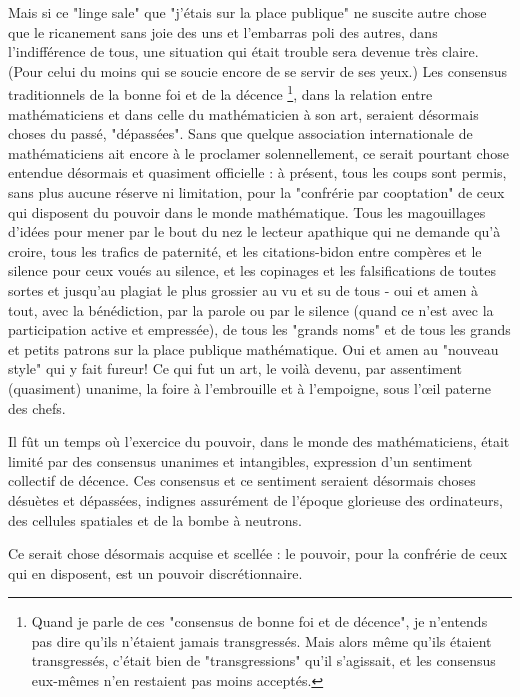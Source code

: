 Mais si ce "linge sale" que "j'étais sur la place publique" ne suscite autre chose que le ricanement sans joie des uns et l'embarras poli des autres, dans l'indifférence de tous, une situation qui était trouble sera devenue très claire. (Pour celui du moins qui se soucie encore de se servir de ses yeux.) Les consensus traditionnels de la bonne foi et de la décence \footnote{Quand je parle de ces "consensus de bonne foi et de décence", je n'entends pas dire qu'ils n'étaient jamais transgressés. Mais alors même qu'ils étaient transgressés, c'était bien de "transgressions" qu'il s'agissait, et les consensus eux-mêmes n'en restaient pas moins acceptés.}, dans la relation entre mathématiciens et dans celle du mathématicien à son art, seraient désormais choses du passé, "dépassées". Sans que quelque association internationale de mathématiciens ait encore à le proclamer solennellement, ce serait pourtant chose entendue désormais et quasiment officielle : à présent, tous les coups sont permis, sans plus aucune réserve ni limitation, pour la "confrérie par cooptation" de ceux qui disposent du pouvoir dans le monde mathématique. Tous les magouillages d'idées pour mener par le bout du nez le lecteur apathique qui ne demande qu'à croire, tous les trafics de paternité, et les citations-bidon entre compères et le silence pour ceux voués au silence, et les copinages et les falsifications de toutes sortes et jusqu'au plagiat le plus grossier au vu et su de tous - oui et amen à tout, avec la bénédiction, par la parole ou par le silence (quand ce n'est avec la participation active et empressée), de tous les "grands noms" et de tous les grands et petits patrons sur la place publique mathématique. Oui et amen au "nouveau style" qui y fait fureur! Ce qui fut un art, le voilà devenu, par assentiment (quasiment) unanime, la foire à l'embrouille et à l'empoigne, sous l'œil paterne des chefs.

Il fût un temps où l'exercice du pouvoir, dans le monde des mathématiciens, était limité par des consensus unanimes et intangibles, expression d'un sentiment collectif de décence. Ces consensus et ce sentiment seraient désormais choses désuètes et dépassées, indignes assurément de l'époque glorieuse des ordinateurs, des cellules spatiales et de la bombe à neutrons.

Ce serait chose désormais acquise et scellée : le pouvoir, pour la confrérie de ceux qui en disposent, est un pouvoir discrétionnaire.

